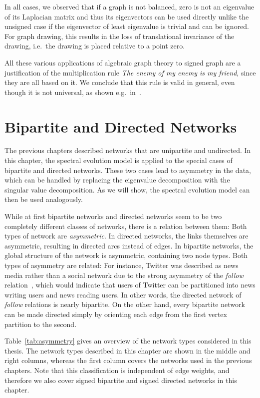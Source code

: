 \documentclass[11pt,a4paper]{book}
\begin{document}
In all cases, we observed that if a graph is not balanced, zero is not
an eigenvalue of its Laplacian matrix and thus its eigenvectors can be used
directly unlike the unsigned case if the eigenvector of least
eigenvalue is trivial and can be ignored.  For graph drawing, this
results in the loss of translational invariance of the drawing, i.e.\ the
drawing is placed relative to a point zero.  

All these various applications of algebraic graph theory to signed graph
are a justification of the multiplication rule \emph{The enemy of my
  enemy is my friend}, since they are all based on it.  We conclude that
this rule is valid in general, even though it is not universal, as shown
e.g.\ in~\cite{b527}. 

\chapter{Bipartite and Directed Networks}
\label{chap:asymmetry}
The previous chapters described networks that are unipartite and
undirected. In this chapter, the spectral evolution model is applied to the
special cases 
of bipartite and directed networks.  These two cases lead to asymmetry
in the data, which can be handled by replacing the eigenvalue
decomposition with the singular value decomposition.  As we will show,
the spectral evolution model can then be used analogously. 

While at first bipartite networks and directed networks seem to be two
completely different classes of networks, 
there is a relation between them:  Both types of network are
\emph{asymmetric}. 
In directed networks, the links themselves are asymmetric, resulting in
directed arcs instead of edges. 
In bipartite networks, the global structure of the network is
asymmetric, containing two node types.
Both types of asymmetry are related:
For instance, 
Twitter was described as news media rather than a social network due
to the strong asymmetry of the \emph{follow} relation~\cite{b545}, which
would indicate that users of Twitter can be partitioned into news
writing users and news reading users.  
In other words, the directed network of \emph{follow} relations is nearly
bipartite. 
On the other hand, every bipartite network can be made directed simply
by orienting each edge from the first vertex partition to the second. 

Table~\ref{tab:asymmetry} gives an overview of the network types
considered in this thesis. 
The network types described in this chapter are shown in the
middle and right columns, whereas the first column covers the networks
used in the previous chapters.  Note that this classification is
independent of edge weights, and therefore we also cover signed bipartite
and signed directed networks in this chapter. 
\end{document}
